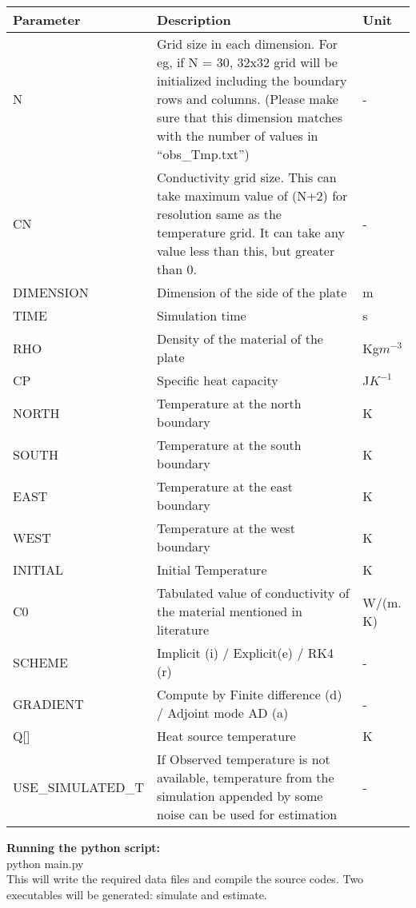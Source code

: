 \documentclass[10pt,a4paper]{report}
\begin{document}
\begin{tabular}{ | m{10em} | m{7cm}| m{1cm} | } 
\hline
\textbf{Parameter} & \textbf{Description} & \textbf{Unit}\\ 
\hline
N& Grid size in each dimension. For eg, if N = 30, 32x32 grid will be initialized including the boundary rows and columns. (Please make sure that this dimension matches with the number of values in “obs\_Tmp.txt”) & - \\ 
\hline
CN & Conductivity grid size. This can take maximum value of (N+2) for resolution same as the temperature grid. It can take any value less than this, but greater than 0. & - \\ 
\hline
DIMENSION & Dimension of the side of the plate & m \\ 
\hline
TIME & Simulation time & s\\
\hline
RHO & Density of the material of the plate & Kg$m^{-3}$\\
\hline
CP & Specific heat capacity & J$K^{-1}$\\
\hline
NORTH & Temperature at the north boundary & K\\
\hline
SOUTH & Temperature at the south boundary & K\\
\hline
EAST & Temperature at the east boundary & K\\
\hline
WEST & Temperature at the west boundary & K\\
\hline
INITIAL & Initial Temperature & K\\
\hline
C0 & Tabulated value of conductivity of the material mentioned in literature & W/(m. K)\\
\hline
SCHEME & Implicit (i) / Explicit(e) / RK4 (r) & -\\
\hline
GRADIENT & Compute by Finite difference (d) / Adjoint mode AD (a) & -\\
\hline
Q[] & Heat source temperature & K\\
\hline
USE\_SIMULATED\_T & If Observed temperature is not available, temperature from the simulation appended by some noise can be used for estimation & -\\
\hline
\end{tabular}
\newpage

\textbf{Running the python script:}\\

python main.py\\


This will write the required data files and compile the source codes. Two executables will be generated: simulate and estimate. 
\end{document}
